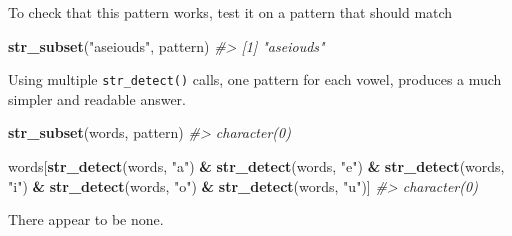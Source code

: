 \documentclass[]{book}
\newenvironment{Shaded}{\begin{snugshade}}{\end{snugshade}}
\newcommand{\CommentTok}[1]{\textcolor[rgb]{0.56,0.35,0.01}{\textit{#1}}}
\newcommand{\ControlFlowTok}[1]{\textcolor[rgb]{0.13,0.29,0.53}{\textbf{#1}}}
\newcommand{\DataTypeTok}[1]{\textcolor[rgb]{0.13,0.29,0.53}{#1}}
\newcommand{\DecValTok}[1]{\textcolor[rgb]{0.00,0.00,0.81}{#1}}
\newcommand{\KeywordTok}[1]{\textcolor[rgb]{0.13,0.29,0.53}{\textbf{#1}}}
\newcommand{\NormalTok}[1]{#1}
\newcommand{\OperatorTok}[1]{\textcolor[rgb]{0.81,0.36,0.00}{\textbf{#1}}}
\newcommand{\StringTok}[1]{\textcolor[rgb]{0.31,0.60,0.02}{#1}}
\theoremstyle{plain}
\theoremstyle{remark}
\begin{document}
\begin{enumerate}
\begin{Shaded}
\end{Shaded}

  To check that this pattern works, test it on a pattern that
  should match

\begin{Shaded}
\begin{Highlighting}[]
\KeywordTok{str_subset}\NormalTok{(}\StringTok{"aseiouds"}\NormalTok{, pattern)}
\CommentTok{#> [1] "aseiouds"}
\end{Highlighting}
\end{Shaded}

  Using multiple \texttt{str\_detect()} calls, one pattern for each vowel,
  produces a much simpler and readable answer.

\begin{Shaded}
\begin{Highlighting}[]
\KeywordTok{str_subset}\NormalTok{(words, pattern)}
\CommentTok{#> character(0)}

\NormalTok{words[}\KeywordTok{str_detect}\NormalTok{(words, }\StringTok{"a"}\NormalTok{) }\OperatorTok{&}
\StringTok{      }\KeywordTok{str_detect}\NormalTok{(words, }\StringTok{"e"}\NormalTok{) }\OperatorTok{&}
\StringTok{      }\KeywordTok{str_detect}\NormalTok{(words, }\StringTok{"i"}\NormalTok{) }\OperatorTok{&}
\StringTok{      }\KeywordTok{str_detect}\NormalTok{(words, }\StringTok{"o"}\NormalTok{) }\OperatorTok{&}
\StringTok{      }\KeywordTok{str_detect}\NormalTok{(words, }\StringTok{"u"}\NormalTok{)]}
\CommentTok{#> character(0)}
\end{Highlighting}
\end{Shaded}

  There appear to be none.
\end{enumerate}
\end{document}

